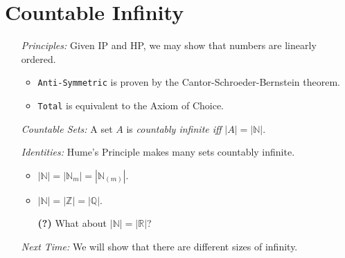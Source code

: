 \documentclass[a4paper, 11pt]{article} %
\newcommand{\abs}[1]{|#1|} %
\newcommand{\N}{\mathbb{N}}
\newcommand{\Z}{\mathbb{Z}}
\newcommand{\Q}{\mathbb{Q}}
\newcommand{\R}{\mathbb{R}}
\begin{document}
\section*{Countable Infinity}

\begin{enumerate}
  \item[\it Principles:] Given IP and HP, we may show that numbers are linearly ordered.
    \begin{itemize}[leftmargin=-.2in]
      \item \texttt{Anti-Symmetric} is proven by the Cantor-Schroeder-Bernstein theorem.
      \item \texttt{Total} is equivalent to the Axiom of Choice.
    \end{itemize}
  \item[\it Countable Sets:] A set $A$ is \textit{countably infinite iff} $\abs{A}=\abs{\N}$.
  \item[\it Identities:] Hume's Principle makes many sets countably infinite.
    \begin{itemize}[leftmargin=-.2in]
      \item $\abs{\N} = \abs{\N_m} = \abs{\N_{(m)}}$.  
      \item $\abs{\N} = \abs{\Z} = \abs{\Q}$.
      \item[\bf (?)] What about $\abs{\N} = \abs{\R}$?
    \end{itemize}
  \item[\it Next Time:] We will show that there are different sizes of infinity.
\end{enumerate}
\end{document}
